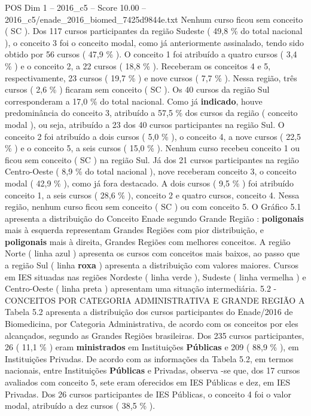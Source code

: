 \begin{textsample}{POS Dim 1 – 2016\_c5 – Score 10.00 – 2016\_c5/enade\_2016\_biomed\_7425d9844e.txt}
Nenhum curso ficou sem conceito ( SC ).
Dos 117 cursos participantes da região Sudeste ( 49,8 \% do total nacional ), o conceito 3 foi o conceito modal, como já anteriormente assinalado, tendo sido obtido por 56 cursos ( 47,9 \% ).
O conceito 1 foi atribuído a quatro cursos ( 3,4 \% ) e o conceito 2, a 22 cursos ( 18,8 \% ).
Receberam os conceitos 4 e 5, respectivamente, 23 cursos ( 19,7 \% ) e nove cursos ( 7,7 \% ).
Nessa região, três cursos ( 2,6 \% ) ficaram sem conceito ( SC ).
Os 40 cursos da região Sul corresponderam a 17,0 \% do total nacional.
Como já \textbf{indicado}, houve predominância do conceito 3, atribuído a 57,5 \% dos cursos da região ( conceito modal ), ou seja, atribuído a 23 dos 40 cursos participantes na região Sul.
O conceito 2 foi atribuído a dois cursos ( 5,0 \% ), o conceito 4, a nove cursos ( 22,5 \% ) e o conceito 5, a seis cursos ( 15,0 \% ).
Nenhum curso recebeu conceito 1 ou ficou sem conceito ( SC ) na região Sul.
Já dos 21 cursos participantes na região Centro-Oeste ( 8,9 \% do total nacional ), nove receberam conceito 3, o conceito modal ( 42,9 \% ), como já fora destacado.
A dois cursos ( 9,5 \% ) foi atribuído conceito 1, a seis cursos ( 28,6 \% ), conceito 2 e quatro cursos, conceito 4.
Nessa região, nenhum curso ficou sem conceito ( SC ) ou com conceito 5.
O Gráfico 5.1 apresenta a distribuição do Conceito Enade segundo Grande Região : \textbf{poligonais} mais à esquerda representam Grandes Regiões com pior distribuição, e \textbf{poligonais} mais à direita, Grandes Regiões com melhores conceitos.
A região Norte ( linha azul ) apresenta os cursos com conceitos mais baixos, ao passo que a região Sul ( linha \textbf{roxa} ) apresenta a distribuição com valores maiores.
Cursos em IES situadas nas regiões Nordeste ( linha verde ), Sudeste ( linha vermelha ) e Centro-Oeste ( linha preta ) apresentam uma situação intermediária. 5.2 - CONCEITOS POR CATEGORIA ADMINISTRATIVA E GRANDE REGIÃO A Tabela 5.2 apresenta a distribuição dos cursos participantes do Enade/2016 de Biomedicina, por Categoria Administrativa, de acordo com os conceitos por eles alcançados, segundo as Grandes Regiões brasileiras.
Dos 235 cursos participantes, 26 ( 11,1 \% ) eram \textbf{ministrados} em Instituições \textbf{Públicas} e 209 ( 88,9 \% ), em Instituições Privadas.
De acordo com as informações da Tabela 5.2, em termos nacionais, entre Instituições \textbf{Públicas} e Privadas, observa -se que, dos 17 cursos avaliados com conceito 5, sete eram oferecidos em IES Públicas e dez, em IES Privadas.
Dos 26 cursos participantes de IES Públicas, o conceito 4 foi o valor modal, atribuído a dez cursos ( 38,5 \% ).

\end{textsample}
